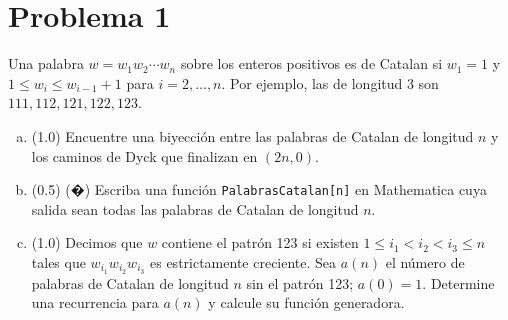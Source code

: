 \section*{Problema 1}
Una palabra $w = w_1 w_2 \cdots w_n$ sobre los enteros positivos es de Catalan si $w_1 = 1$ y $1 \le w_i \le w_{i-1} + 1$ para $i = 2,\dots,n$. Por ejemplo, las de longitud 3 son $111,112,121,122,123$.
\begin{enumerate}[a)]
  \item (1.0) Encuentre una biyección entre las palabras de Catalan de longitud $n$ y los caminos de Dyck que finalizan en $(2n,0)$.
  \item (0.5) (�) Escriba una función \texttt{PalabrasCatalan[n]} en Mathematica cuya salida sean todas las palabras de Catalan de longitud $n$.
  \item (1.0) Decimos que $w$ contiene el patrón 123 si existen $1 \le i_1 < i_2 < i_3 \le n$ tales que $w_{i_1} w_{i_2} w_{i_3}$ es estrictamente creciente. Sea $a(n)$ el número de palabras de Catalan de longitud $n$ sin el patrón 123; $a(0)=1$. Determine una recurrencia para $a(n)$ y calcule su función generadora.
\end{enumerate}
